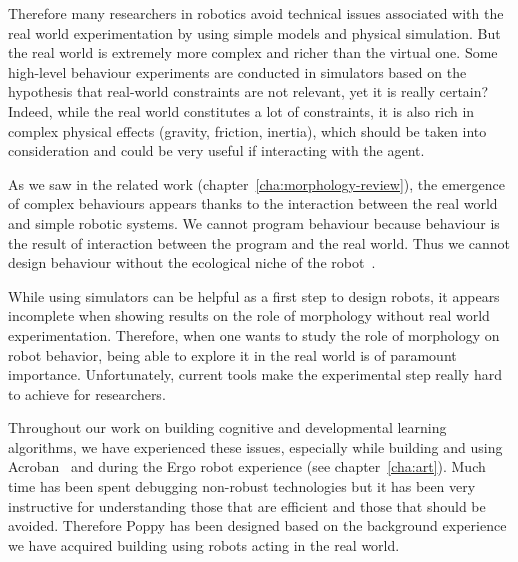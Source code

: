 Therefore many researchers in robotics avoid technical issues associated with the real world experimentation by using simple models and physical simulation. But the real world is extremely more complex and richer than the virtual one.
Some high-level behaviour experiments are conducted in simulators based on the hypothesis that real-world constraints are not relevant, yet it is really certain?
Indeed, while the real world constitutes a lot of constraints, it is also rich in complex physical effects (gravity, friction, inertia), which should be taken into consideration and could be very useful if interacting with the agent.

As we saw in the related work (chapter~\ref{cha:morphology-review}), the emergence of complex behaviours appears thanks to the interaction between the real world and simple robotic systems. We cannot program behaviour because behaviour is the result of interaction  between the program and the real world. Thus we cannot design behaviour without the ecological niche of the robot~\cite{Steels1991emergence}.

While using simulators can be helpful as a first step to design robots, it appears incomplete when showing results on the role of morphology without real world experimentation.
Therefore, when one wants to study the role of morphology on robot behavior, being able to explore it in the real world is of paramount importance. Unfortunately, current tools make the experimental step really hard to achieve for researchers.

Throughout our work on building cognitive and developmental learning algorithms, we have experienced these issues, especially while building and using Acroban~\cite{ly2011bio} and during the Ergo robot experience (see chapter~\ref{cha:art}). Much time has been spent debugging non-robust technologies but it has been very instructive for understanding those that are efficient and those that should be avoided.
Therefore Poppy has been designed based on the background experience we have acquired building using robots acting in the real world.

